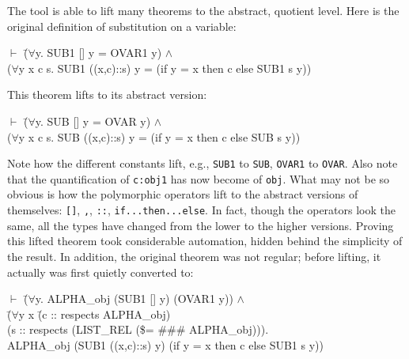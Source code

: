 \documentclass[envcountsame,runningheads]{llncs}
\begin{document}
The tool is able to lift many theorems to the abstract, quotient level.
Here is the original definition of substitution on a variable:
{\tt \begin{tabbing}
$\vdash$ \=($\forall$y. SUB1 [] y = OVAR1 y) $\wedge$ \\
\> ($\forall$y x c s. SUB1 ((x,c)::s) y = (if y = x then c else SUB1 s y))
\end{tabbing}}
This theorem lifts to its abstract version:
{\tt \begin{tabbing}
$\vdash$ \=($\forall$y. SUB [] y = OVAR y) $\wedge$ \\
\> ($\forall$y x c s. SUB ((x,c)::s) y = (if y = x then c else SUB s y))
\end{tabbing}}
Note how the different constants lift, e.g., {\tt SUB1} to {\tt SUB},
{\tt OVAR1} to {\tt OVAR}.  Also note that the quantification of
{\tt c:obj1} has now become of {\tt obj}.
What may not be so obvious is how the
polymorphic operators lift to the abstract versions of themselves:
{\tt []}, {\tt ,}, {\tt ::}, {\tt if...then...else}.
In fact, though the operators look the same, all the types have changed
from the lower to the higher versions.
Proving this lifted theorem took considerable automation,
hidden behind
the simplicity of the result.
In addition, the original theorem was not regular; before lifting,
it actually was first quietly converted to:
{\tt \begin{tabbing}
$\vdash$ \=($\forall$y. ALPHA\_obj (SUB1 [] y) (OVAR1 y)) $\wedge$ \\
\>   (\=$\forall$y x \=(c :: respects ALPHA\_obj) \\
\>\>\> (s :: respects (LIST\_REL (\$= \#\#\# ALPHA\_obj))). \\
\>\>  ALPHA\_obj (SUB1 ((x,c)::s) y) (if y = x then c else SUB1 s y))
\end{tabbing}}
\end{document}
